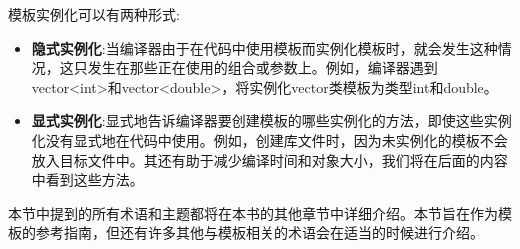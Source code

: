 模板实例化可以有两种形式:

\begin{itemize}
\item
\textbf{隐式实例化}:当编译器由于在代码中使用模板而实例化模板时，就会发生这种情况，这只发生在那些正在使用的组合或参数上。例如，编译器遇到vector<int>和vector<double>，将实例化vector类模板为类型int和double。

\item
\textbf{显式实例化}:显式地告诉编译器要创建模板的哪些实例化的方法，即使这些实例化没有显式地在代码中使用。例如，创建库文件时，因为未实例化的模板不会放入目标文件中。其还有助于减少编译时间和对象大小，我们将在后面的内容中看到这些方法。
\end{itemize}

本节中提到的所有术语和主题都将在本书的其他章节中详细介绍。本节旨在作为模板的参考指南，但还有许多其他与模板相关的术语会在适当的时候进行介绍。



